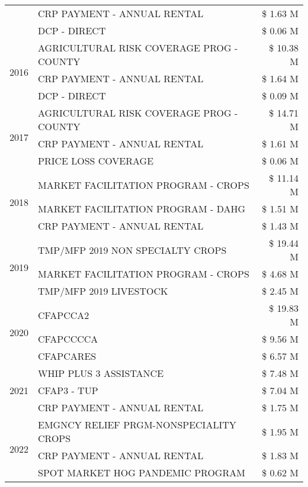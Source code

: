\begin{tabular}{llr}
 & CRP PAYMENT - ANNUAL RENTAL & \$ 1.63 M \\
 & DCP - DIRECT & \$ 0.06 M \\
\cline{1-3}
\multirow[t]{3}{*}{2016} & AGRICULTURAL RISK COVERAGE PROG - COUNTY & \$ 10.38 M \\
 & CRP PAYMENT - ANNUAL RENTAL & \$ 1.64 M \\
 & DCP - DIRECT & \$ 0.09 M \\
\cline{1-3}
\multirow[t]{3}{*}{2017} & AGRICULTURAL RISK COVERAGE PROG - COUNTY & \$ 14.71 M \\
 & CRP PAYMENT - ANNUAL RENTAL & \$ 1.61 M \\
 & PRICE LOSS COVERAGE & \$ 0.06 M \\
\cline{1-3}
\multirow[t]{3}{*}{2018} & MARKET FACILITATION PROGRAM - CROPS & \$ 11.14 M \\
 & MARKET FACILITATION PROGRAM - DAHG & \$ 1.51 M \\
 & CRP PAYMENT - ANNUAL RENTAL & \$ 1.43 M \\
\cline{1-3}
\multirow[t]{3}{*}{2019} & TMP/MFP 2019 NON SPECIALTY CROPS & \$ 19.44 M \\
 & MARKET FACILITATION PROGRAM - CROPS & \$ 4.68 M \\
 & TMP/MFP 2019 LIVESTOCK & \$ 2.45 M \\
\cline{1-3}
\multirow[t]{3}{*}{2020} & CFAPCCA2 & \$ 19.83 M \\
 & CFAPCCCCA & \$ 9.56 M \\
 & CFAPCARES & \$ 6.57 M \\
\cline{1-3}
\multirow[t]{3}{*}{2021} & WHIP PLUS 3 ASSISTANCE & \$ 7.48 M \\
 & CFAP3 - TUP & \$ 7.04 M \\
 & CRP PAYMENT - ANNUAL RENTAL & \$ 1.75 M \\
\cline{1-3}
\multirow[t]{3}{*}{2022} & EMGNCY RELIEF PRGM-NONSPECIALITY CROPS & \$ 1.95 M \\
 & CRP PAYMENT - ANNUAL RENTAL & \$ 1.83 M \\
 & SPOT MARKET HOG PANDEMIC PROGRAM & \$ 0.62 M \\
\cline{1-3}
\bottomrule
\end{tabular}
